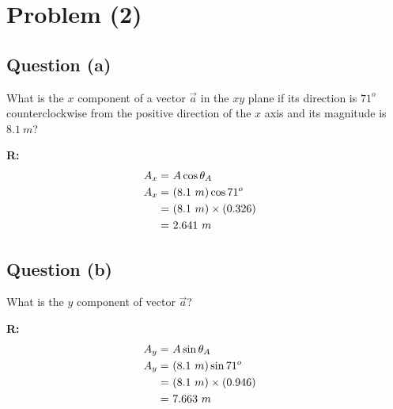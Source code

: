 \section{Problem (2)}

	\subsection{Question (a)}

		What is the $x$ component of a vector $\vec{a}$ in the $xy$ plane if its direction is $71^{o}$ counterclockwise from the positive direction of the $x$ axis and its magnitude is $8.1 \ m$?

		\textbf{R:} \newline
		\begin{align}
			A_{x} = \ &A \cos \theta_{A}& \notag \\
			A_{x} = \ &(8.1 \ m) \cos{71^{o}}& \notag \\
			= \ &(8.1 \ m) \times (0.326)& \notag \\
			= \ &2.641 \ m&
		\end{align}

	\subsection{Question (b)}

		What is the $y$ component of vector $\vec{a}$?

		\textbf{R:} \newline
		\begin{align}
			A_{y} = \ &A \sin{\theta_{A}}& \notag \\
			A_{y} = \ &(8.1 \ m) \sin{71^{o}}& \notag \\
			= \ &(8.1 \ m) \times (0.946)& \notag \\
			= \ &7.663 \ m&
		\end{align}
